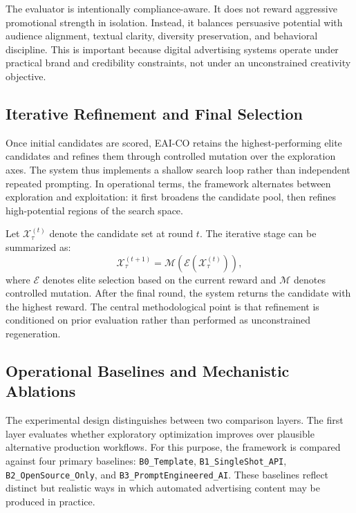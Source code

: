 \documentclass[applsci,article,submit,pdftex,moreauthors]{Definitions/mdpi}
\begin{document}
The evaluator is intentionally compliance-aware. It does not reward aggressive promotional strength in isolation. Instead, it balances persuasive potential with audience alignment, textual clarity, diversity preservation, and behavioral discipline. This is important because digital advertising systems operate under practical brand and credibility constraints, not under an unconstrained creativity objective.

\subsection{Iterative Refinement and Final Selection}

Once initial candidates are scored, EAI-CO retains the highest-performing elite candidates and refines them through controlled mutation over the exploration axes. The system thus implements a shallow search loop rather than independent repeated prompting. In operational terms, the framework alternates between exploration and exploitation: it first broadens the candidate pool, then refines high-potential regions of the search space.

Let $\mathcal{X}_{\tau}^{(t)}$ denote the candidate set at round $t$. The iterative stage can be summarized as:
\begin{equation}
\mathcal{X}_{\tau}^{(t+1)} = \mathcal{M}\left(\mathcal{E}\left(\mathcal{X}_{\tau}^{(t)}\right)\right),
\end{equation}
where $\mathcal{E}$ denotes elite selection based on the current reward and $\mathcal{M}$ denotes controlled mutation. After the final round, the system returns the candidate with the highest reward. The central methodological point is that refinement is conditioned on prior evaluation rather than performed as unconstrained regeneration.

\subsection{Operational Baselines and Mechanistic Ablations}

The experimental design distinguishes between two comparison layers. The first layer evaluates whether exploratory optimization improves over plausible alternative production workflows. For this purpose, the framework is compared against four primary baselines: \texttt{B0\_Template}, \texttt{B1\_SingleShot\_API}, \texttt{B2\_OpenSource\_Only}, and \texttt{B3\_PromptEngineered\_AI}. These baselines reflect distinct but realistic ways in which automated advertising content may be produced in practice.
\end{document}
